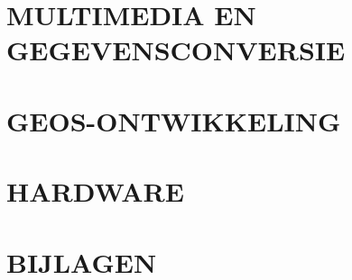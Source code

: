 {}

\part{MULTIMEDIA EN GEGEVENSCONVERSIE}

\part{GEOS-ONTWIKKELING}

\part{HARDWARE}



\part{BIJLAGEN}

\appendix
  
  
  
  


\nocite{*}



\printindex



